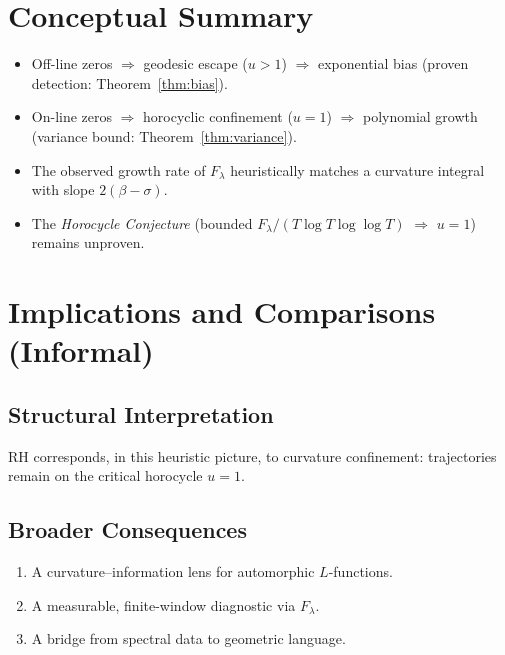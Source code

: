 \section{Conceptual Summary}

\begin{itemize}
  \item Off-line zeros $\Rightarrow$ geodesic escape ($u>1$) $\Rightarrow$ exponential bias (proven detection: Theorem~\ref{thm:bias}).
  \item On-line zeros $\Rightarrow$ horocyclic confinement ($u=1$) $\Rightarrow$ polynomial growth (variance bound: Theorem~\ref{thm:variance}).
  \item The observed growth rate of $F_\lambda$ heuristically matches a curvature integral with slope $2(\beta-\sigma)$.
  \item The \emph{Horocycle Conjecture} (bounded $F_\lambda/(T\log T\log\log T)$ $\Rightarrow$ $u=1$) remains unproven.
\end{itemize}

\section{Implications and Comparisons (Informal)}

\subsection{Structural Interpretation}
RH corresponds, in this heuristic picture, to curvature confinement: trajectories remain on the critical horocycle $u=1$.

\subsection{Broader Consequences}
\begin{enumerate}
  \item A curvature–information lens for automorphic $L$-functions.
  \item A measurable, finite-window diagnostic via $F_\lambda$.
  \item A bridge from spectral data to geometric language.
\end{enumerate}


